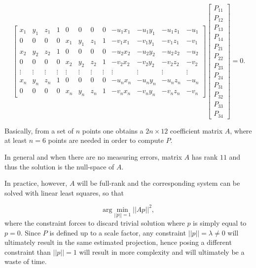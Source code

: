 \documentclass[10pt]{report}
\begin{document}
\[ \begin{bmatrix} x_1    & y_1    & z_1    & 1      & 0      & 0      & 0      & 0      & -u_1 x_1 & -u_1 y_1 & -u_1 z_1 & -u_1 \\ 0      & 0      & 0      & 0      & x_1    & y_1    & z_1    & 1      & -v_1 x_1 & -v_1 y_1 & -v_1 z_1 & -v_1 \\ x_2    & y_2    & z_2    & 1      & 0      & 0      & 0      & 0      & -u_2 x_2 & -u_2 y_2 & -u_2 z_2 & -u_2 \\ 0      & 0      & 0      & 0      & x_2    & y_2    & z_2    & 1      & -v_2 x_2 & -v_2 y_2 & -v_2 z_2 & -v_2 \\ \vdots & \vdots & \vdots & \vdots & \vdots & \vdots & \vdots & \vdots & \vdots   & \vdots   & \vdots   & \vdots \\ x_n    & y_n    & z_n    & 1      & 0      & 0      & 0      & 0      & -u_n x_n & -u_n y_n & -u_n z_n & -u_n \\ 0      & 0      & 0      & 0      & x_n    & y_n    & z_n    & 1      & -v_n x_n & -v_n y_n & -v_n z_n & -v_n \end{bmatrix} \begin{bmatrix} P_{11}\\ P_{12}\\ P_{13}\\ P_{14}\\ P_{21}\\ P_{22}\\ P_{23}\\ P_{24}\\ P_{31}\\ P_{32}\\ P_{33}\\ P_{34} \end{bmatrix} = 0. \]

Basically, from a set of \(n\) points one obtains a \(2n \times 12\)
coefficient matrix \(A\), where at least \(n = 6\) points are needed in
order to compute \(P\).

In general and when there are no measuring errors, matrix \(A\) has rank
\(11\) and thus the solution is the null-space of \(A\).

In practice, however, \(A\) will be full-rank and the corresponding
system can be solved with linear least squares, so that

\[\mbox{arg} \min_{||p|| = 1} ||Ap||^2,\] where the constraint forces to
discard trivial solution where \(p\) is simply equal to \(p = 0\). Since
\(P\) is defined up to a scale factor, any constraint
\(||p|| = \lambda \neq 0\) will ultimately result in the same estimated
projection, hence posing a different constraint than \(||p|| = 1\) will
result in more complexity and will ultimately be a waste of time.
\end{document}
